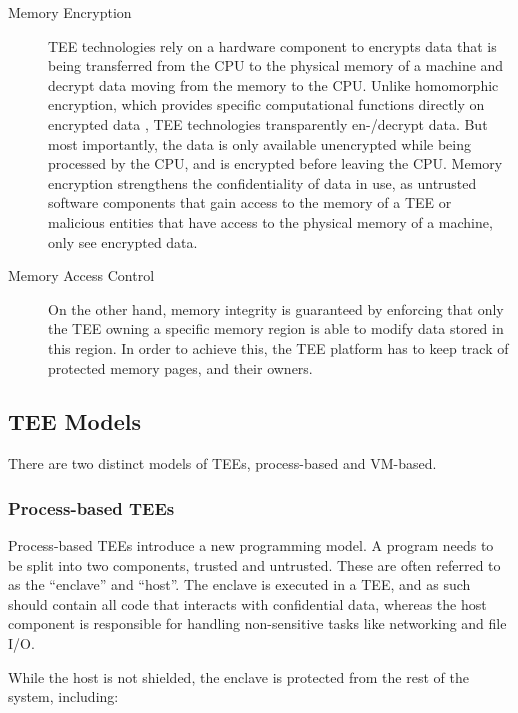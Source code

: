 \begin{description}
  \item[Memory Encryption]
    TEE technologies rely on a hardware component to encrypts data that is being
    transferred from the CPU to the physical memory of a machine and decrypt
    data moving from the memory to the CPU. Unlike homomorphic encryption, which
    provides specific computational functions directly on encrypted data
    \cite{monique2013homomorphicencryption}, TEE technologies transparently
    en-/decrypt data. But most importantly, the data is only available
    unencrypted while being processed by the CPU, and is encrypted before
    leaving the CPU. Memory encryption strengthens the confidentiality of data
    in use, as untrusted software components that gain access to the memory of a
    TEE or malicious entities that have access to the physical memory of a
    machine, only see encrypted data.

  \item[Memory Access Control]
    On the other hand, memory integrity is guaranteed by enforcing that only the
    TEE owning a specific memory region is able to modify data stored in this
    region. In order to achieve this, the TEE platform has to keep track of
    protected memory pages, and their owners.
\end{description}

\subsection{TEE Models}
\label{sec:tee-models}

There are two distinct models of TEEs, process-based and VM-based.

\subsubsection{Process-based TEEs}
\label{sec:process-based-tees}

Process-based TEEs introduce a new programming model. A program needs to be
split into two components, trusted and untrusted. These are often referred to as
the ``enclave'' and ``host''. The enclave is executed in a TEE, and as such
should contain all code that interacts with confidential data, whereas the host
component is responsible for handling non-sensitive tasks like networking and
file I/O.

While the host is not shielded, the enclave is protected from the rest of the
system, including:

